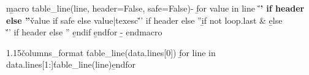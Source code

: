 \b{macro table_line(line, header=False, safe=False)-}
\b{for value in line}
\v{'\textbf{' if header else ''}\v{value if safe else value|texesc}\v{'}' if header else ''}\b{if not loop.last} & \b{else} \\\v{'\midrule\endhead' if header else ''}
\b{endif}
\b{endfor}
\b{- endmacro}

\small

\renewcommand\arraystretch{1.2}

\begin{spacing}{.9}
\setlength\LTleft{-.5in}
\setlength\LTright{-.5in}
\begin{tabularx}{1.15\linewidth}{\v{columns_format}}
\toprule
\v{table_line(data.lines[0])}
\midrule
\b{for line in data.lines[1:]}\v{table_line(line)}\b{endfor}\bottomrule
\end{tabularx}
\end{spacing}
